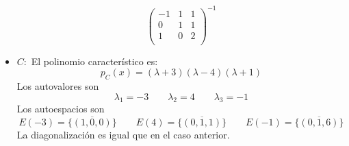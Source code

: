 \begin{mdframed}[style=s]
\begin{itemize}
\[\begin{pmatrix}
                    -1&1&1\\
                    0 &1&1\\
                    1 &0&2\\
                \end{pmatrix}^{-1}\]
            \item $C:$
                El polinomio característico es:\[p_C(x)=(\lambda+3)(\lambda-4)(\lambda+1)\]
                Los autovalores son \[\lambda_1=-3\qquad \lambda_2=4\qquad \lambda_3=-1\]
                Los autoespacios son \[E(-3)=\overline{\{(1,0,0)\}}\qquad E(4)=\overline{\{(0,1,1)\}}\qquad E(-1)=\overline{\{(0,1,6)\}}\]
                La diagonalización es igual que en el caso anterior.
        \end{itemize}
    \end{mdframed}